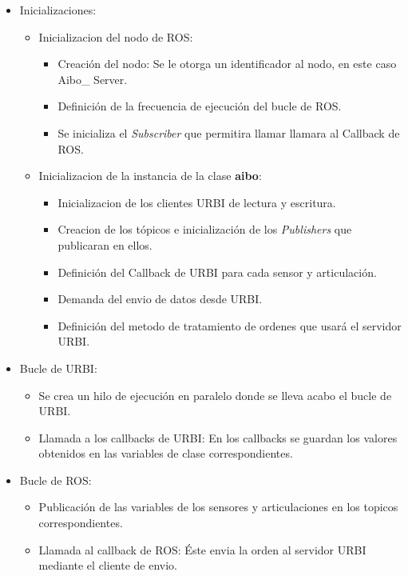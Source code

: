 \documentclass[12pt,a4paper,final,twoside]{article}
\begin{document}
\begin{itemize}
\item Inicializaciones: 
\begin{itemize}
\item Inicializacion del nodo de ROS:
\begin{itemize}
\item Creación del nodo: Se le otorga un identificador al nodo, en este caso Aibo\_ Server.
\item Definición de la frecuencia de ejecución del bucle de ROS.
\item Se inicializa el \textit{Subscriber} que permitira llamar llamara al Callback de ROS.   
\end{itemize}

\item Inicializacion de la instancia de la clase \textbf{aibo}:
\begin{itemize}
\item Inicializacion de los clientes URBI de lectura y escritura.
\item Creacion de los tópicos e inicialización de los \textit{Publishers} que publicaran en ellos.
\item Definición del Callback de URBI para cada sensor y articulación.
\item Demanda del envio de datos desde URBI.
\item Definición del metodo de tratamiento de ordenes que usará el servidor URBI.
\end{itemize}
\end{itemize}
\item Bucle de URBI:
\begin{itemize}
\item Se crea un hilo de ejecución en paralelo donde se lleva acabo el bucle de URBI.
\item Llamada a los callbacks de URBI: En los callbacks se guardan los valores obtenidos en las variables de clase correspondientes.

\end{itemize}
\item Bucle de ROS:
\begin{itemize}
\item Publicación de las variables de los sensores y articulaciones en los topicos correspondientes.
\item Llamada al callback de ROS: Éste envia la orden al servidor URBI mediante el cliente de envio.
\end{itemize}
\end{itemize}
\end{document}
